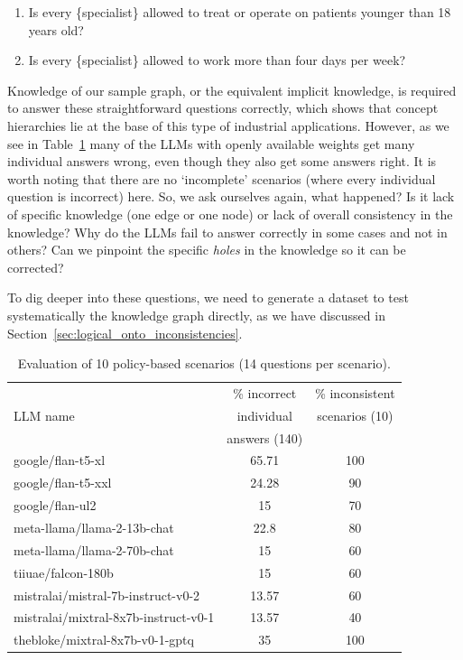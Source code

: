 \documentclass{article} %
\begin{document}
\begin{enumerate}
\item Is every \{specialist\} allowed to treat or operate on patients younger than 18 years old?
\item Is every \{specialist\} allowed to work more than four days per week?
\end{enumerate} 

Knowledge of our sample graph, or the equivalent implicit knowledge, is required to answer these straightforward questions correctly, which shows that concept hierarchies lie at the base of this type of industrial applications. However, as we see in Table~\ref{tab:realistic_scenarios} many of the LLMs with openly available weights get many individual answers wrong, even though they also get some answers right. It is worth noting that there are no `incomplete' scenarios (where every individual question is incorrect) here. So, we ask ourselves again, what happened? Is it lack of specific knowledge (one edge or one node) or lack of overall consistency in the knowledge? Why do the LLMs fail to answer correctly in some cases and not in others? Can we pinpoint the specific \textit{holes} in the knowledge so it can be corrected?  

To dig deeper into these questions, we need to generate a dataset to test systematically the knowledge graph directly, as we have discussed in Section~\ref{sec:logical_onto_inconsistencies}.   

\begin{table}[htbp]
  \centering
  \caption{Evaluation of 10 policy-based scenarios (14 questions per scenario).}
  \setlength{\tabcolsep}{2pt}
    \begin{tabular}{lcc}
    \toprule
    \multicolumn{1}{l}{\multirow{3}[1]{*}{LLM name}} & \multicolumn{1}{c}{\% incorrect} & \multicolumn{1}{c}{\% inconsistent} \\
    & \multicolumn{1}{c}{individual} & \multicolumn{1}{c}{scenarios (10)} \\
    & \multicolumn{1}{c}{answers (140)} & \multicolumn{1}{c}{} \\
    \midrule
    google/flan-t5-xl \citep{flan-t5} & 65.71 & 100 \\
    google/flan-t5-xxl \citep{flan-t5} & 24.28 & 90 \\
    google/flan-ul2 \citep{flan-ul2} & 15    & 70 \\
    meta-llama/llama-2-13b-chat \citep{llama} & 22.8  & 80 \\
    meta-llama/llama-2-70b-chat \citep{llama} & 15    & 60 \\
    tiiuae/falcon-180b \citep{falcon} & 15    & 60 \\
    mistralai/mistral-7b-instruct-v0-2 \citep{mistral} & 13.57 & 60 \\
    mistralai/mixtral-8x7b-instruct-v0-1 \citep{mixtral} & 13.57 & 40 \\
    thebloke/mixtral-8x7b-v0-1-gptq \citep{thebloke-mixtral} & 35    & 100 \\
    \bottomrule
    \end{tabular}%
  \label{tab:realistic_scenarios}%
\end{table}%
\end{document}
